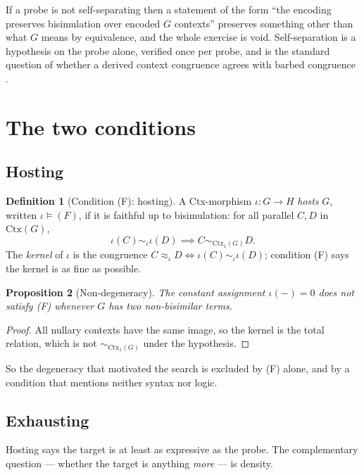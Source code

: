 \documentclass[11pt,a4paper]{article}
\theoremstyle{definition}
\newtheorem{definition}{Definition}[section]
\theoremstyle{plain}
\newtheorem{proposition}[definition]{Proposition}
\theoremstyle{remark}
\newcommand{\Ctx}{\mathrm{Ctx}}
\begin{document}
If a probe is not self-separating then a statement of the form ``the encoding
preserves bisimulation over encoded $G$ contexts'' preserves something other than
what $G$ means by equivalence, and the whole exercise is void. Self-separation is a
hypothesis on the probe alone, verified once per probe, and is the standard question
of whether a derived context congruence agrees with barbed congruence
\cite{leifer-milner,sewell}.

\section{The two conditions}
\label{sec:conditions}

\subsection{Hosting}

\begin{definition}[Condition (F): hosting]
\label{def:F}
A Ctx-morphism $\iota : G \to H$ \emph{hosts} $G$, written $\iota \models (F)$, if it
is faithful up to bisimulation: for all parallel $C, D$ in $\Ctx(G)$,
\[
\iota(C) \sim_\iota \iota(D) \implies C \sim_{\Ctx_1(G)} D .
\]
The \emph{kernel} of $\iota$ is the congruence
$C \approx_\iota D \iff \iota(C) \sim_\iota \iota(D)$; condition (F) says the kernel
is as fine as possible.
\end{definition}

\begin{proposition}[Non-degeneracy]
\label{prop:nondeg}
The constant assignment $\iota(-) = 0$ does not satisfy (F) whenever $G$ has two
non-bisimilar terms.
\end{proposition}

\begin{proof}
All nullary contexts have the same image, so the kernel is the total relation,
which is not $\sim_{\Ctx_1(G)}$ under the hypothesis.
\end{proof}

So the degeneracy that motivated the search is excluded by (F) alone, and by a
condition that mentions neither syntax nor logic.

\subsection{Exhausting}

Hosting says the target is at least as expressive as the probe. The complementary
question --- whether the target is anything \emph{more} --- is density.
\end{document}
